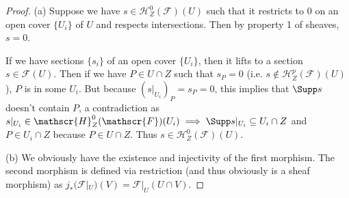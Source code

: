 \begin{proof}
	(a) Suppose we have $s\in \mathscr{H}_Z^0(\mathscr{F})(U) $ such that it restricts to $0$ on an open cover $\{U_i\}   $ of $U $ and respects intersections.
	Then by property 1 of sheaves, $s=0 $.

	If we have sections $\{s_i\} $ of an open cover $\{U_i\}   $, then it lifts to a section $s \in \mathscr{F}(U) $.
	Then if we have $P \in U \cap Z$ such that $s_P = 0 $ (i.e. $s \notin \mathscr{H}_Z^p(\mathscr{F})(U) $), $P $ is in some $U_i $.
	But because $(s|_{U_i})_P = s_P =0$, this implies that $\Supp s $ doesn't contain $P $, a contradiction as $s|_{U_i} \in \mathscr{H}_Z^0(\mathscr{F})(U_i) \implies \Supp s|_{U_i} \subseteq U_i \cap Z$ and $P \in U_i\cap Z $ because $P \in U \cap Z $.
	Thus $s \in \mathscr{H}_Z^0(\mathscr{F})(U) $.

	(b) We obviously have the existence and injectivity of the first morphism.
	The second morphism is defined via restriction (and thus obviously is a sheaf morphism) as $j_\ast(\mathscr{F}|_U)(V) = \mathscr{F}|_U(U\cap V)$.



\end{proof}
